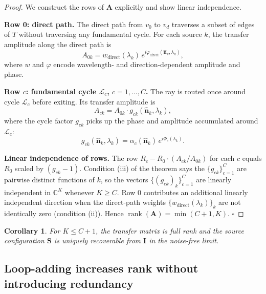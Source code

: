 \documentclass[11pt,twocolumn,a4paper]{article}
\newtheorem{corollary}[theorem]{Corollary}
\theoremstyle{definition}
\theoremstyle{remark}
\newcommand{\Cmat}{\mathbf{A}}
\newcommand{\Ivec}{\mathbf{I}}
\newcommand{\Svec}{\mathbf{S}}
\newcommand{\Loop}{\mathcal{L}}
\newcommand{\rank}{\operatorname{rank}}
\begin{document}
\begin{proof}
We construct the rows of $\Cmat$ explicitly and show linear independence.

\textbf{Row 0: direct path.} The direct path from $v_0$ to $v_d$ traverses a subset of edges of $T$ without traversing any fundamental cycle. For each source $k$, the transfer amplitude along the direct path is
\begin{equation}
A_{0k} = w_{\mathrm{direct}}(\lambda_k)\, e^{i \varphi_{\mathrm{direct}}(\hat{\mathbf{n}}_k, \lambda_k)},
\end{equation}
where $w$ and $\varphi$ encode wavelength- and direction-dependent amplitude and phase.

\textbf{Row $c$: fundamental cycle $\Loop_c$, $c = 1, \ldots, C$.} The ray is routed once around cycle $\Loop_c$ before exiting. Its transfer amplitude is
\begin{equation}
A_{ck} = A_{0k} \cdot g_{ck}(\hat{\mathbf{n}}_k, \lambda_k),
\end{equation}
where the cycle factor $g_{ck}$ picks up the phase and amplitude accumulated around $\Loop_c$:
\begin{equation}
g_{ck}(\hat{\mathbf{n}}_k, \lambda_k) = \alpha_c(\hat{\mathbf{n}}_k) \, e^{i \Phi_c(\lambda_k)}.
\end{equation}

\textbf{Linear independence of rows.} The row $R_c - R_0 \cdot (A_{ck}/A_{0k})$ for each $c$ equals $R_0$ scaled by $(g_{ck} - 1)$. Condition (iii) of the theorem says the $\{g_{ck}\}_{c=1}^C$ are pairwise distinct functions of $k$, so the vectors $\{(g_{ck})_k\}_{c=1}^C$ are linearly independent in $\mathbb{C}^K$ whenever $K \geq C$. Row $0$ contributes an additional linearly independent direction when the direct-path weights $\{w_{\mathrm{direct}}(\lambda_k)\}_k$ are not identically zero (condition (ii)). Hence $\rank(\Cmat) = \min(C+1, K)$. $\square$
\end{proof}

\begin{corollary}
\label{cor:full_rank}
For $K \leq C + 1$, the transfer matrix is full rank and the source configuration $\Svec$ is uniquely recoverable from $\Ivec$ in the noise-free limit.
\end{corollary}

\subsection{Loop-adding increases rank without introducing redundancy}
\end{document}
